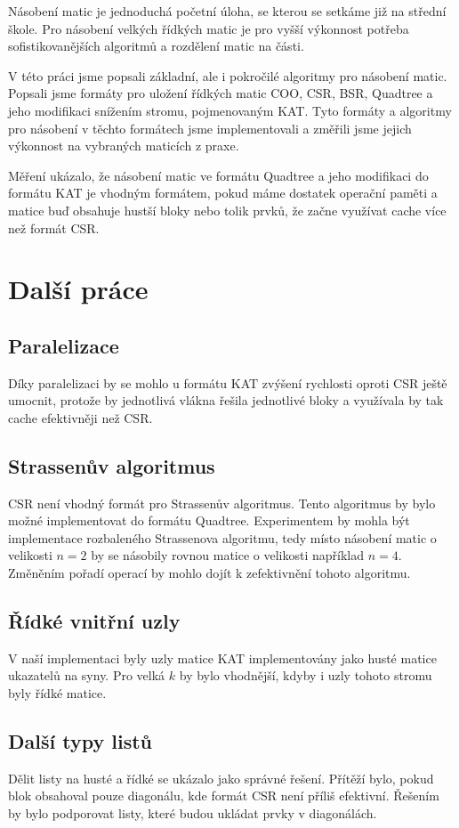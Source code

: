 \documentclass[thesis=B,czech]{FITthesis}[2012/06/26]
\begin{document}
\begin{conclusion}

Násobení matic je jednoduchá početní úloha, se kterou se setkáme již na střední škole. Pro násobení velkých řídkých matic je pro vyšší výkonnost potřeba  sofistikovanějších algoritmů a rozdělení matic na části.

V této práci jsme popsali základní, ale i pokročilé algoritmy pro násobení matic. Popsali jsme formáty pro uložení řídkých matic COO, CSR, BSR, Quadtree a jeho modifikaci snížením stromu, pojmenovaným KAT. Tyto formáty a algoritmy pro násobení v těchto formátech jsme implementovali a změřili jsme jejich výkonnost na vybraných maticích z praxe.

Měření ukázalo, že násobení matic ve formátu Quadtree a jeho modifikaci do formátu KAT je vhodným formátem, pokud máme dostatek operační paměti a matice buď obsahuje hustší bloky nebo tolik prvků, že začne využívat cache více než formát CSR.

\section{Další práce}

\subsection{Paralelizace}

Díky paralelizaci by se mohlo u formátu KAT zvýšení rychlosti oproti CSR ještě umocnit, protože by jednotlivá vlákna řešila jednotlivé bloky a využívala by tak cache efektivněji než CSR. 

\subsection{Strassenův algoritmus}

CSR není vhodný formát pro Strassenův algoritmus. Tento algoritmus by bylo možné implementovat do formátu Quadtree. Experimentem by mohla být implementace rozbaleného Strassenova algoritmu, tedy místo násobení matic o velikosti $n = 2$ by se násobily rovnou matice o velikosti například $n = 4$. Změněním pořadí operací by mohlo dojít k zefektivnění tohoto algoritmu. 

\subsection{Řídké vnitřní uzly}
	
V naší implementaci byly uzly matice KAT implementovány jako husté matice ukazatelů na syny. Pro velká $k$ by bylo vhodnější, kdyby i uzly tohoto stromu byly řídké matice.	

\subsection{Další typy listů}

Dělit listy na husté a řídké se ukázalo jako správné řešení. Přítěží bylo, pokud blok obsahoval pouze diagonálu, kde formát CSR není příliš efektivní. Řešením by bylo podporovat listy, které budou ukládat prvky v diagonálách.

\end{conclusion}
\end{document}
